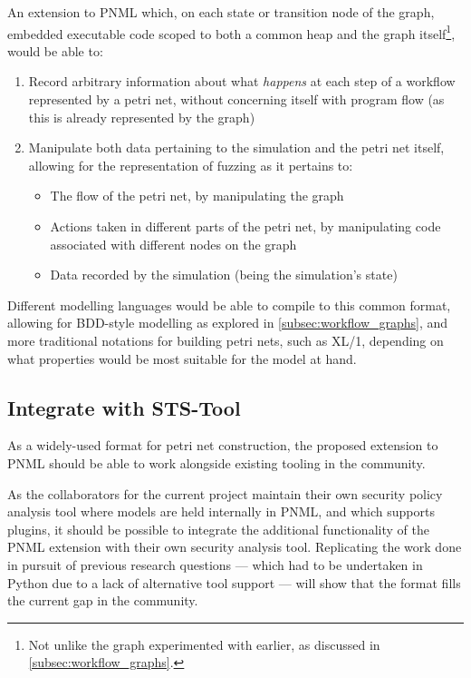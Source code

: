 \documentclass[11pt]{article}
\begin{document}
An extension to PNML which, on each state or transition node of the graph,
embedded executable code scoped to both a common heap and the graph
itself\footnote{Not unlike the graph experimented with earlier, as discussed in
\cref{subsec:workflow_graphs}.}, would be able to:

\begin{enumerate}
\item Record arbitrary information about what \emph{happens} at each step of a workflow
represented by a petri net, without concerning itself with program flow (as
this is already represented by the graph)
\item Manipulate both data pertaining to the simulation and the petri net itself,
allowing for the representation of fuzzing as it pertains to:
\begin{itemize}
\item The flow of the petri net, by manipulating the graph
\item Actions taken in different parts of the petri net, by manipulating code
associated with different nodes on the graph
\item Data recorded by the simulation (being the simulation's state)
\end{itemize}
\end{enumerate}

Different modelling languages would be able to compile to this common format,
allowing for BDD-style modelling as explored in \cref{subsec:workflow_graphs},
and more traditional notations for building petri nets, such as XL/1\cite{xl1},
depending on what properties would be most suitable for the model at hand.


\subsection{Integrate with STS-Tool}
\label{sec:org2d51950}
As a widely-used format for petri net construction, the proposed extension to
PNML should be able to work alongside existing tooling in the community.

As the collaborators for the current project maintain their own security policy
analysis tool where models are held internally in PNML, and which supports
plugins, it should be possible to integrate the additional functionality of the
PNML extension with their own security analysis tool\cite{mattia_sts}. Replicating the work
done in pursuit of previous research questions --- which had to be undertaken in
Python due to a lack of alternative tool support --- will show that the format
fills the current gap in the community.
\end{document}
